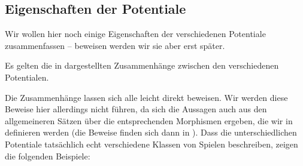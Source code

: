 \subsection{Eigenschaften der Potentiale}

Wir wollen hier noch einige Eigenschaften der verschiedenen Potentiale zusammenfassen -- beweisen werden wir sie aber erst später.

\begin{satz}\label{satz:ZusammenaengePotentiale}
	Es gelten die in  dargestellten Zusammenhänge zwischen den verschiedenen Potentialen.
\end{satz}

Die Zusammenhänge lassen sich alle leicht direkt beweisen. Wir werden diese Beweise hier allerdings nicht führen, da sich die Aussagen auch aus den allgemeineren Sätzen über die entsprechenden Morphismen ergeben, die wir in  definieren werden (die Beweise finden sich dann in ). Dass die unterschiedlichen Potentiale tatsächlich echt verschiedene Klassen von Spielen beschreiben, zeigen die folgenden Beispiele: 


